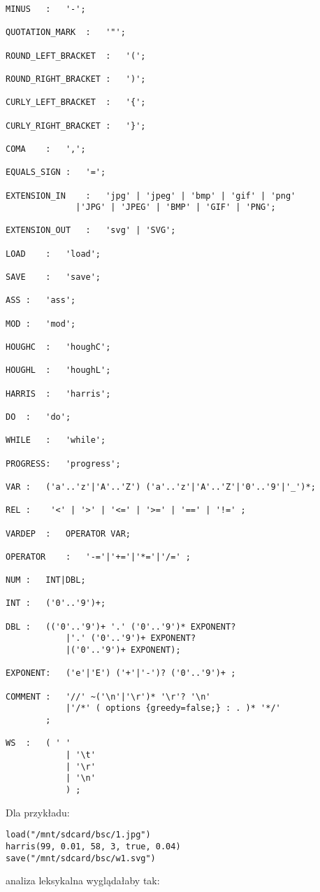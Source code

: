 \documentclass[11pt,a4paper]{article}
\begin{document}
\begin{verbatim}
MINUS	:	'-';
					
QUOTATION_MARK	:	'"';

ROUND_LEFT_BRACKET	:	'(';
	
ROUND_RIGHT_BRACKET	:	')';
	
CURLY_LEFT_BRACKET	:	'{';
	
CURLY_RIGHT_BRACKET	:	'}';
	
COMA	:	',';

EQUALS_SIGN	:	'=';	

EXTENSION_IN	:	'jpg' | 'jpeg' | 'bmp' | 'gif' | 'png'
              |'JPG' | 'JPEG' | 'BMP' | 'GIF' | 'PNG';
	
EXTENSION_OUT	:	'svg' | 'SVG';
	
LOAD	:	'load';

SAVE	:	'save';

ASS	:	'ass';

MOD	:	'mod';

HOUGHC	:	'houghC';

HOUGHL	:	'houghL';

HARRIS	:	'harris';

DO	:	'do';

WHILE	:	'while';

PROGRESS:	'progress';

VAR	:	('a'..'z'|'A'..'Z') ('a'..'z'|'A'..'Z'|'0'..'9'|'_')*;

REL	:	 '<' | '>' | '<=' | '>=' | '==' | '!=' ;

VARDEP	:	OPERATOR VAR;

OPERATOR	:	'-='|'+='|'*='|'/='	;
	
NUM	:	INT|DBL;

INT	:	('0'..'9')+;

DBL	:	(('0'..'9')+ '.' ('0'..'9')* EXPONENT?
    		|'.' ('0'..'9')+ EXPONENT?
    		|('0'..'9')+ EXPONENT);

EXPONENT:	('e'|'E') ('+'|'-')? ('0'..'9')+ ;

COMMENT	:	'//' ~('\n'|'\r')* '\r'? '\n'
    		|'/*' ( options {greedy=false;} : . )* '*/'
		;

WS	:	( ' '
        	| '\t'
        	| '\r'
        	| '\n'
        	) ;
\end{verbatim}
Dla przykładu:
\begin{verbatim}
load("/mnt/sdcard/bsc/1.jpg")
harris(99, 0.01, 58, 3, true, 0.04)
save("/mnt/sdcard/bsc/w1.svg")
\end{verbatim}
analiza leksykalna wyglądałaby tak:
\end{document}
